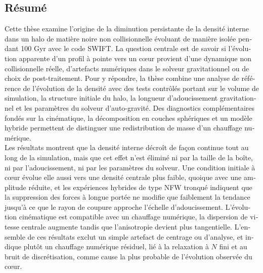 \begin{otherlanguage}{french}
\cleardoublepage
\chapter*{Résumé}
Cette thèse examine l'origine de la diminution persistante de la densité interne dans un halo de matière noire non collisionnelle évoluant de manière isolée pendant 100 Gyr avec le code SWIFT. La question centrale est de savoir si l'évolution apparente d'un profil à pointe vers un cœur provient d'une dynamique non collisionnelle réelle, d'artefacts numériques dans le solveur gravitationnel ou de choix de post-traitement. Pour y répondre, la thèse combine une analyse de référence de l'évolution de la densité avec des tests contrôlés portant sur le volume de simulation, la structure initiale du halo, la longueur d'adoucissement gravitationnel et les paramètres du solveur d'auto-gravité. Des diagnostics complémentaires fondés sur la cinématique, la décomposition en couches sphériques et un modèle hybride permettent de distinguer une redistribution de masse d'un chauffage numérique.\\

Les résultats montrent que la densité interne décroît de façon continue tout au long de la simulation, mais que cet effet n'est éliminé ni par la taille de la boîte, ni par l'adoucissement, ni par les paramètres du solveur. Une condition initiale à cœur évolue elle aussi vers une densité centrale plus faible, quoique avec une amplitude réduite, et les expériences hybrides de type NFW tronqué indiquent que la suppression des forces à longue portée ne modifie que faiblement la tendance jusqu'à ce que le rayon de coupure approche l'échelle d'adoucissement. L'évolution cinématique est compatible avec un chauffage numérique, la dispersion de vitesse centrale augmente tandis que l'anisotropie devient plus tangentielle. L'ensemble de ces résultats exclut un simple artefact de centrage ou d'analyse, et indique plutôt un chauffage numérique résiduel, lié à la relaxation à $N$ fini et au bruit de discrétisation, comme cause la plus probable de l'évolution observée du cœur.
\end{otherlanguage}


